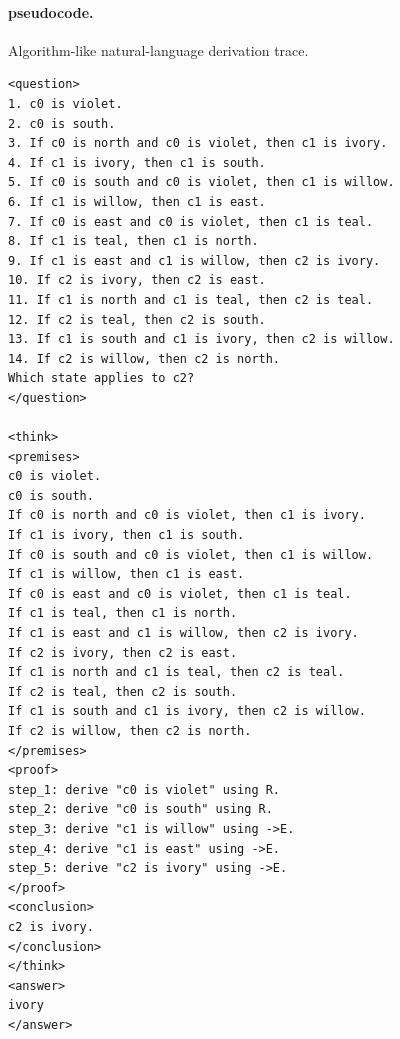 \documentclass[10pt]{article}
\begin{document}
\paragraph{pseudocode.} Algorithm-like natural-language derivation trace.
\begin{verbatim}
<question>
1. c0 is violet.
2. c0 is south.
3. If c0 is north and c0 is violet, then c1 is ivory.
4. If c1 is ivory, then c1 is south.
5. If c0 is south and c0 is violet, then c1 is willow.
6. If c1 is willow, then c1 is east.
7. If c0 is east and c0 is violet, then c1 is teal.
8. If c1 is teal, then c1 is north.
9. If c1 is east and c1 is willow, then c2 is ivory.
10. If c2 is ivory, then c2 is east.
11. If c1 is north and c1 is teal, then c2 is teal.
12. If c2 is teal, then c2 is south.
13. If c1 is south and c1 is ivory, then c2 is willow.
14. If c2 is willow, then c2 is north.
Which state applies to c2?
</question>

<think>
<premises>
c0 is violet.
c0 is south.
If c0 is north and c0 is violet, then c1 is ivory.
If c1 is ivory, then c1 is south.
If c0 is south and c0 is violet, then c1 is willow.
If c1 is willow, then c1 is east.
If c0 is east and c0 is violet, then c1 is teal.
If c1 is teal, then c1 is north.
If c1 is east and c1 is willow, then c2 is ivory.
If c2 is ivory, then c2 is east.
If c1 is north and c1 is teal, then c2 is teal.
If c2 is teal, then c2 is south.
If c1 is south and c1 is ivory, then c2 is willow.
If c2 is willow, then c2 is north.
</premises>
<proof>
step_1: derive "c0 is violet" using R.
step_2: derive "c0 is south" using R.
step_3: derive "c1 is willow" using ->E.
step_4: derive "c1 is east" using ->E.
step_5: derive "c2 is ivory" using ->E.
</proof>
<conclusion>
c2 is ivory.
</conclusion>
</think>
<answer>
ivory
</answer>
\end{verbatim}
\end{document}
